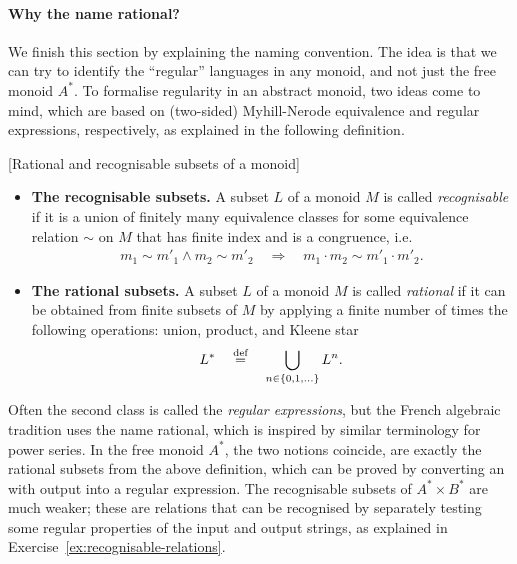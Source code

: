\paragraph*{Why the name rational?} We finish this section by explaining the naming convention. The idea is that we can try to identify the ``regular'' languages in any monoid, and not just the free monoid $A^*$. To formalise regularity in an abstract monoid, two ideas come to mind, which are based on (two-sided) Myhill-Nerode equivalence and regular expressions, respectively, as explained in the following definition.
\begin{definition}\label{def:rational-recognisable-subsets}
    [Rational and recognisable subsets of a monoid] \ 
    \begin{itemize}
    \item \textbf{The recognisable subsets.} A subset $L$ of a monoid $M$  is called \emph{recognisable} if it is a union of finitely many equivalence classes for some equivalence relation $\sim$ on $M$ that has finite index and is a congruence, i.e.
    \begin{align*}
    m_1 \sim m'_1 \land m_2 \sim m'_2 \quad \Rightarrow \quad m_1 \cdot m_2 \sim m'_1 \cdot m'_2.
    \end{align*}
    \item \textbf{The rational subsets.} A subset $L$ of a monoid $M$ is called \emph{rational} if it can be obtained from finite subsets of $M$ by applying a finite number of times the following operations: union, product, and Kleene star
    \begin{align*}
    L^* \quad \stackrel{\text{def}}= \quad \bigcup_{n \in \{0,1,\ldots\}}L^n.
    \end{align*}
    \end{itemize}
\end{definition}
Often the second class is called the \emph{regular expressions}, but the French algebraic tradition uses the name rational, which is inspired by similar terminology for power series.
In the free monoid $A^*$, the two notions coincide, are exactly the rational subsets from the above definition, which can be proved by converting an \nfa with output into a regular expression. The recognisable subsets of $A^* \times B^*$ are much weaker; these are relations that can be recognised by separately testing some regular properties of the input and output strings, as explained in Exercise~\ref{ex:recognisable-relations}.



